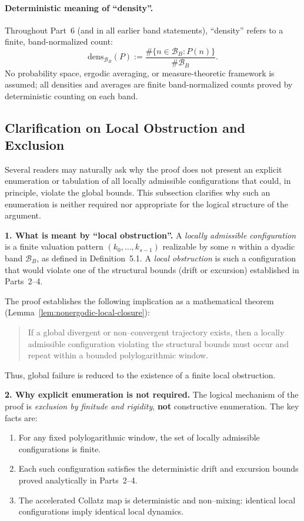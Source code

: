 \documentclass[preprint,12pt]{elsarticle}
\newcommand{\densB}[2]{\mathrm{dens}_{#1}\!\left(#2\right)}
\newcommand{\NoProbRef}{No probability space, ergodic averaging, or measure-theoretic framework is assumed; all densities and averages are finite band-normalized counts proved by deterministic counting on each band.}
\begin{document}
\paragraph{Deterministic meaning of ``density''.}
Throughout Part~6 (and in all earlier band statements), ``density'' refers to a finite, band-normalized count:
\[
\densB{\mathcal{B}_B}{P}
:= \frac{\#\{n\in\mathcal{B}_B : P(n)\}}{\#\mathcal{B}_B}.
\]
\noindent\NoProbRef\par

\subsection*{Clarification on Local Obstruction and Exclusion}

Several readers may naturally ask why the proof does not present an explicit
enumeration or tabulation of all locally admissible configurations that could,
in principle, violate the global bounds. This subsection clarifies why such an
enumeration is neither required nor appropriate for the logical structure of
the argument.

\medskip

\noindent\textbf{1. What is meant by ``local obstruction''.}
A \emph{locally admissible configuration} is a finite valuation pattern
$(k_0,\dots,k_{s-1})$ realizable by some $n$ within a dyadic band
$\mathcal{B}_B$, as defined in Definition~5.1.
A \emph{local obstruction} is such a configuration that would violate one of
the structural bounds (drift or excursion) established in Parts~2--4.

The proof establishes the following implication as a mathematical theorem
(Lemma~\ref{lem:nonergodic-local-closure}):

\begin{quote}
If a global divergent or non--convergent trajectory exists, then a locally
admissible configuration violating the structural bounds must occur and repeat
within a bounded polylogarithmic window.
\end{quote}

Thus, global failure is reduced to the existence of a finite local obstruction.

\medskip

\noindent\textbf{2. Why explicit enumeration is not required.}
The logical mechanism of the proof is \emph{exclusion by finitude and rigidity},
\textbf{not} constructive enumeration. The key facts are:

\begin{enumerate}
\item For any fixed polylogarithmic window, the set of locally admissible
configurations is finite.
\item Each such configuration satisfies the deterministic drift and excursion
bounds proved analytically in Parts~2--4.
\item The accelerated Collatz map is deterministic and non--mixing: identical
local configurations imply identical local dynamics.
\end{enumerate}
\end{document}
